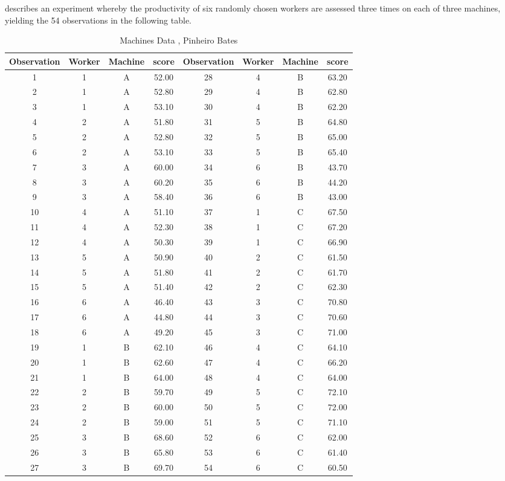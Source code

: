 
\citet{PB} describes an experiment whereby the productivity of six
randomly chosen workers are assessed three times on each of three
machines, yielding the 54 observations in the following table.


\begin{table}[h!]
	\begin{center}
		\begin{tabular}{|c|c|c|c||c|c|c|c|}
			\hline
			Observation & Worker & Machine & score & Observation & Worker & Machine & score \\
			\hline
			1 & 1 & A & 52.00 &	28 & 4 & B & 63.20 \\
			2 & 1 & A & 52.80 &	  29 & 4 & B & 62.80 \\
			3 & 1 & A & 53.10 &	  30 & 4 & B & 62.20 \\
			4 & 2 & A & 51.80 &	  31 & 5 & B & 64.80 \\
			5 & 2 & A & 52.80 &	  32 & 5 & B & 65.00 \\
			6 & 2 & A & 53.10 &	  33 & 5 & B & 65.40 \\
			7 & 3 & A & 60.00 &	  34 & 6 & B & 43.70 \\
			8 & 3 & A & 60.20 &	  35 & 6 & B & 44.20 \\
			9 & 3 & A & 58.40 &	  36 & 6 & B & 43.00 \\
			10 & 4 & A & 51.10 &	  37 & 1 & C & 67.50 \\
			11 & 4 & A & 52.30 &	  38 & 1 & C & 67.20 \\
			12 & 4 & A & 50.30 &	  39 & 1 & C & 66.90 \\
			13 & 5 & A & 50.90 &	  40 & 2 & C & 61.50 \\
			14 & 5 & A & 51.80 &	  41 & 2 & C & 61.70 \\
			15 & 5 & A & 51.40 &	  42 & 2 & C & 62.30 \\
			16 & 6 & A & 46.40 &	  43 & 3 & C & 70.80 \\
			17 & 6 & A & 44.80 &	  44 & 3 & C & 70.60 \\
			18 & 6 & A & 49.20 &	  45 & 3 & C & 71.00 \\
			19 & 1 & B & 62.10 &	  46 & 4 & C & 64.10 \\
			20 & 1 & B & 62.60 &	  47 & 4 & C & 66.20 \\
			21 & 1 & B & 64.00 &	  48 & 4 & C & 64.00 \\
			22 & 2 & B & 59.70 &	  49 & 5 & C & 72.10 \\
			23 & 2 & B & 60.00 &	  50 & 5 & C & 72.00 \\
			24 & 2 & B & 59.00 &	  51 & 5 & C & 71.10 \\
			25 & 3 & B & 68.60 &	  52 & 6 & C & 62.00 \\
			26 & 3 & B & 65.80 &	  53 & 6 & C & 61.40 \\
			27 & 3 & B & 69.70 &	  54 & 6 & C & 60.50 \\
			
			\hline
		\end{tabular}
		\caption{Machines Data , Pinheiro Bates}
	\end{center}
\end{table}
